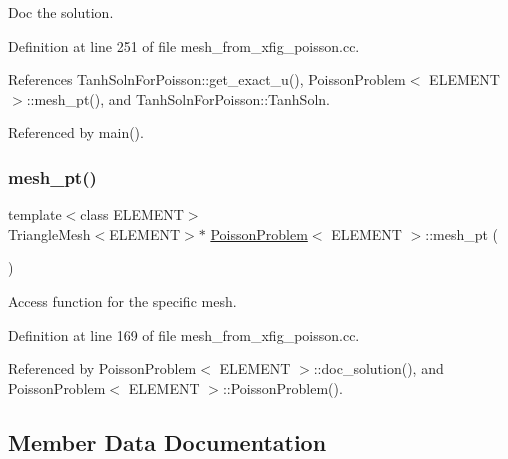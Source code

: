 Doc the solution. 



Definition at line 251 of file mesh\+\_\+from\+\_\+xfig\+\_\+poisson.\+cc.



References Tanh\+Soln\+For\+Poisson\+::get\+\_\+exact\+\_\+u(), Poisson\+Problem$<$ E\+L\+E\+M\+E\+N\+T $>$\+::mesh\+\_\+pt(), and Tanh\+Soln\+For\+Poisson\+::\+Tanh\+Soln.



Referenced by main().

\mbox{\label{classPoissonProblem_ad428aa9392108f968db64534fc23ba86}} 
\subsubsection{\texorpdfstring{mesh\+\_\+pt()}{mesh\_pt()}}
{\footnotesize\ttfamily template$<$class E\+L\+E\+M\+E\+NT$>$ \\
Triangle\+Mesh$<$E\+L\+E\+M\+E\+NT$>$$\ast$ \hyperlink{classPoissonProblem}{Poisson\+Problem}$<$ E\+L\+E\+M\+E\+NT $>$\+::mesh\+\_\+pt (\begin{DoxyParamCaption}{ }\end{DoxyParamCaption})\hspace{0.3cm}{\ttfamily [inline]}}



Access function for the specific mesh. 



Definition at line 169 of file mesh\+\_\+from\+\_\+xfig\+\_\+poisson.\+cc.



Referenced by Poisson\+Problem$<$ E\+L\+E\+M\+E\+N\+T $>$\+::doc\+\_\+solution(), and Poisson\+Problem$<$ E\+L\+E\+M\+E\+N\+T $>$\+::\+Poisson\+Problem().



\subsection{Member Data Documentation}
\mbox{\label{classPoissonProblem_a32b954cca3c38175d0816f92e1c0da46}} 
